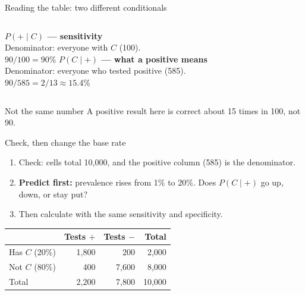 \documentclass[aspectratio=169,10pt]{beamer}
\begin{document}
\begin{frame}{Reading the table: two different conditionals}
\begin{columns}[T]
\textbf{$P(+\mid C)$ --- sensitivity}\\[1mm]
Denominator: everyone with $C$ (100).\\
$90/100 = 90\%$
\textbf{$P(C\mid +)$ --- what a positive means}\\[1mm]
Denominator: everyone who tested positive (585).\\
$90/585 = 2/13 \approx 15.4\%$
\end{columns}
\vspace{4mm}
\begin{alertblock}{Not the same number}
A positive result here is correct about 15 times in 100, not 90.
\end{alertblock}
\end{frame}

\begin{frame}{Check, then change the base rate}
\begin{enumerate}
\item Check: cells total 10{,}000, and the positive column (585) is the denominator.
\item \textbf{Predict first:} prevalence rises from 1\% to 20\%. Does $P(C\mid +)$ go up, down, or stay put?
\item Then calculate with the same sensitivity and specificity.
\end{enumerate}
\vspace{2mm}
\centering
\begin{tabular}{l|r|r|r}
 & Tests $+$ & Tests $-$ & Total \\ \hline
Has $C$ (20\%) & 1{,}800 & 200 & 2{,}000 \\
Not $C$ (80\%) & 400 & 7{,}600 & 8{,}000 \\ \hline
Total & 2{,}200 & 7{,}800 & 10{,}000
\end{tabular}
\end{frame}
\end{document}
